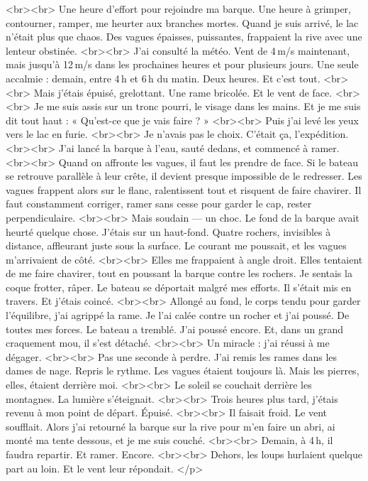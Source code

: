 <br><br>
Une heure d’effort pour rejoindre ma barque. Une heure à grimper, contourner, ramper, me heurter aux branches mortes. Quand je suis arrivé, le lac n’était plus que chaos. Des vagues épaisses, puissantes, frappaient la rive avec une lenteur obstinée.
<br><br>
J’ai consulté la météo. Vent de 4 m/s maintenant, mais jusqu’à 12 m/s dans les prochaines heures et pour plusieurs jours. Une seule accalmie : demain, entre 4 h et 6 h du matin. Deux heures. Et c’est tout.
<br><br>
Mais j’étais épuisé, grelottant. Une rame bricolée. Et le vent de face.
<br><br>
Je me suis assis sur un tronc pourri, le visage dans les mains. Et je me suis dit tout haut : « Qu’est-ce que je vais faire ? »
<br><br>
Puis j’ai levé les yeux vers le lac en furie.
<br><br>
Je n’avais pas le choix. C’était ça, l’expédition.
<br><br>
J’ai lancé la barque à l’eau, sauté dedans, et commencé à ramer.
<br><br>
Quand on affronte les vagues, il faut les prendre de face. Si le bateau se retrouve parallèle à leur crête, il devient presque impossible de le redresser. Les vagues frappent alors sur le flanc, ralentissent tout et risquent de faire chavirer. Il faut constamment corriger, ramer sans cesse pour garder le cap, rester perpendiculaire.
<br><br>
Mais soudain — un choc. Le fond de la barque avait heurté quelque chose. J’étais sur un haut-fond. Quatre rochers, invisibles à distance, affleurant juste sous la surface. Le courant me poussait, et les vagues m’arrivaient de côté.
<br><br>
Elles me frappaient à angle droit. Elles tentaient de me faire chavirer, tout en poussant la barque contre les rochers. Je sentais la coque frotter, râper. Le bateau se déportait malgré mes efforts. Il s’était mis en travers. Et j’étais coincé.
<br><br>
Allongé au fond, le corps tendu pour garder l’équilibre, j’ai agrippé la rame. Je l’ai calée contre un rocher et j’ai poussé. De toutes mes forces. Le bateau a tremblé. J’ai poussé encore. Et, dans un grand craquement mou, il s’est détaché.
<br><br>
Un miracle : j’ai réussi à me dégager.
<br><br>
Pas une seconde à perdre. J’ai remis les rames dans les dames de nage. Repris le rythme. Les vagues étaient toujours là. Mais les pierres, elles, étaient derrière moi.
<br><br>
Le soleil se couchait derrière les montagnes. La lumière s’éteignait.
<br><br>
Trois heures plus tard, j’étais revenu à mon point de départ. Épuisé.
<br><br>
Il faisait froid. Le vent soufflait. Alors j’ai retourné la barque sur la rive pour m’en faire un abri, ai monté ma tente dessous, et je me suis couché.
<br><br>
Demain, à 4 h, il faudra repartir. Et ramer. Encore.
<br><br>
Dehors, les loups hurlaient quelque part au loin. Et le vent leur répondait.
</p>




